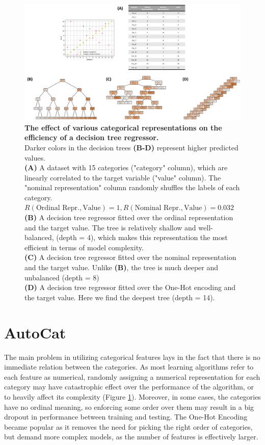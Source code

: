 \documentclass{article}
\begin{document}
\begin{figure}
\includegraphics[width=\textwidth]{imgs/figure1}

\caption{\label{figure:fig1}
\textbf{The effect of various categorical representations on the efficiency of a decision tree regressor.} \\
Darker colors in the decision trees \textbf{(B-D)} represent higher predicted values.\\
\textbf{(A)} A dataset with 15 categories ("category" column), which are linearly correlated to the target variable ("value" column). The "nominal representation" column randomly shuffles the labels of each category. $R(\text{Ordinal Repr.}, \text{Value})=1, R(\text{Nominal Repr.}, \text{Value})=0.032$ \\
\textbf{(B)} A decision tree regressor fitted over the ordinal representation and the target value. The tree is relatively shallow and well-balanced, (depth = 4), which makes this representation the most efficient in terms of model complexity. \\
\textbf{(C)} A decision tree regressor fitted over the nominal representation and the target value. Unlike \textbf{(B)}, the tree is much deeper and unbalanced (depth = 8) \\
\textbf{(D)} A decision tree regressor fitted over the One-Hot encoding and the target value. Here we find the deepest tree (depth = 14). \\
}
\end{figure}

\section{AutoCat}
The main problem in utilizing categorical features lays in the fact that there is no immediate relation between the categories. As most learning algorithms refer to each feature as numerical, randomly assigning a numerical representation for each category may have catastrophic effect over the performance of the algorithm, or to heavily affect its complexity (Figure \ref{figure:fig1}). Moreover, in some cases, the categories have no ordinal meaning, so enforcing some order over them may result in a big dropout in performance between training and testing. The One-Hot Encoding became popular as it removes the need for picking the right order of categories, but demand more complex models, as the number of features is effectively larger. 
\end{document}
